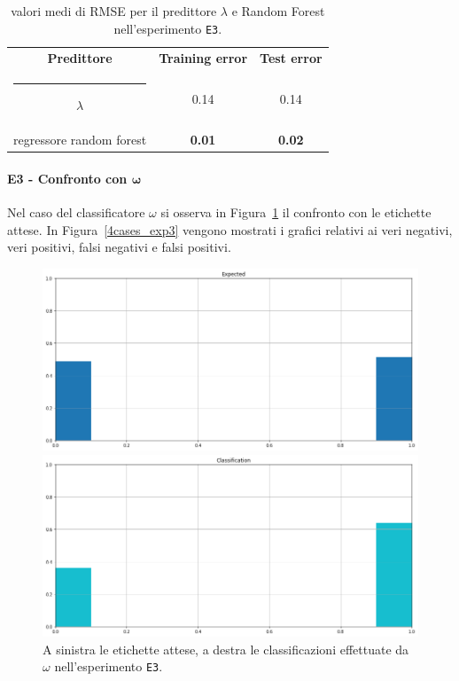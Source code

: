 \documentclass[12pt]{report}
\makeatletter
\theoremstyle{definition}
\newcommand{\thickhline}{%
    \noalign {\ifnum 0=`}\fi \hrule height 1pt
    \futurelet \reserved@a \@xhline
}
\makeatother
\begin{document}
\begin{table}
\centering
\begin{adjustbox}{max width=\textwidth}
 \begin{tabular}{|c|c|c|} 
 \hline
\textbf{Predittore} & \textbf{Training error} & \textbf{Test error}
\\ [0.5ex] 
 \thickhline
 $\lambda$ & 0.14 & 0.14 \\
 regressore random forest & \textbf{0.01} & \textbf{0.02}
 \\
 \hline
\end{tabular}
\end{adjustbox}
\caption{valori medi di RMSE per il predittore $\lambda$ e Random Forest nell'esperimento \texttt{E3}.}
\label{rmse_exp3}
\end{table}

\paragraph{E3 - Confronto con $\bm{\omega}$}
Nel caso del classificatore $\omega$ si osserva in Figura~\ref{classification_exp3} il confronto con le etichette attese. 
In Figura~\ref{4cases_exp3} vengono mostrati i grafici relativi ai veri negativi, veri positivi, falsi negativi e falsi positivi.
\begin{figure}
\centering
    \begin{minipage}{0.48\textwidth}
        \includegraphics[width=\linewidth]{images/experiment_beta05_disgiunti/expected_classification.png}
    \end{minipage}
    \begin{minipage}{0.48\textwidth}
        \includegraphics[width=\linewidth]{images/experiment_beta05_disgiunti/prediction_classification.png}
    \end{minipage}
    \caption{A sinistra le etichette attese, a destra le classificazioni effettuate da $\omega$ nell'esperimento \texttt{E3}.}
    \label{classification_exp3}
\end{figure}
\end{document}
